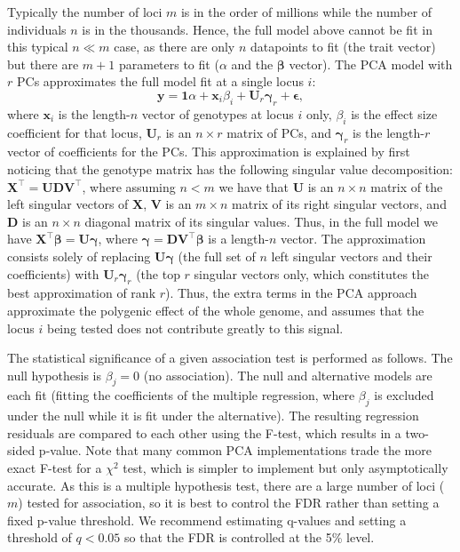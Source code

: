 \documentclass[11pt]{article}
\begin{document}
Typically the number of loci $m$ is in the order of millions while the number of individuals $n$ is in the thousands.
Hence, the full model above cannot be fit in this typical $n \ll m$ case, as there are only $n$ datapoints to fit (the trait vector) but there are $m+1$ parameters to fit ($\alpha$ and the $\mathbf{\beta}$ vector).
The PCA model with $r$ PCs approximates the full model fit at a single locus $i$:
\begin{equation}
  \label{eq:pca_gwas}
  \mathbf{y}
  =
  \mathbf{1} \alpha + \mathbf{x}_i \beta_i + \mathbf{U}_r \mathbf{\gamma}_r + \mathbf{\epsilon}
  ,
\end{equation}
where $\mathbf{x}_i$ is the length-$n$ vector of genotypes at locus $i$ only,
$\beta_i$ is the effect size coefficient for that locus,
$\mathbf{U}_r$ is an $n \times r$ matrix of PCs, and
$\mathbf{\gamma}_r$ is the length-$r$ vector of coefficients for the PCs.
This approximation is explained by first noticing that the genotype matrix has the following singular value decomposition:
$\mathbf{X}^\intercal = \mathbf{U} \mathbf{D} \mathbf{V}^\intercal$,
where assuming $n < m$ we have that
$\mathbf{U}$ is an $n \times n$ matrix of the left singular vectors of $\mathbf{X}$,
$\mathbf{V}$ is an $m \times n$ matrix of its right singular vectors, and
$\mathbf{D}$ is an $n \times n$ diagonal matrix of its singular values.
Thus, in the full model we have
$\mathbf{X}^\intercal \mathbf{\beta} = \mathbf{U} \mathbf{\gamma}$,
where
$\mathbf{\gamma} = \mathbf{D} \mathbf{V}^\intercal \mathbf{\beta}$ is a length-$n$ vector.
The approximation consists solely of replacing $\mathbf{U} \mathbf{\gamma}$ (the full set of $n$ left singular vectors and their coefficients) with $\mathbf{U}_r \mathbf{\gamma}_r$ (the top $r$ singular vectors only, which constitutes the best approximation of rank $r$).
Thus, the extra terms in the PCA approach approximate the polygenic effect of the whole genome, and assumes that the locus $i$ being tested does not contribute greatly to this signal.

The statistical significance of a given association test is performed as follows.
The null hypothesis is $\beta_j = 0$ (no association).
The null and alternative models are each fit (fitting the coefficients of the multiple regression, where $\beta_j$ is excluded under the null while it is fit under the alternative).
The resulting regression residuals are compared to each other using the F-test, which results in a two-sided p-value.
Note that many common PCA implementations trade the more exact F-test for a $\chi^2$ test, which is simpler to implement but only asymptotically accurate.
As this is a multiple hypothesis test, there are a large number of loci ($m$) tested for association, so it is best to control the FDR rather than setting a fixed p-value threshold.
We recommend estimating q-values and setting a threshold of $q < 0.05$ so that the FDR is controlled at the 5\% level.
\end{document}
